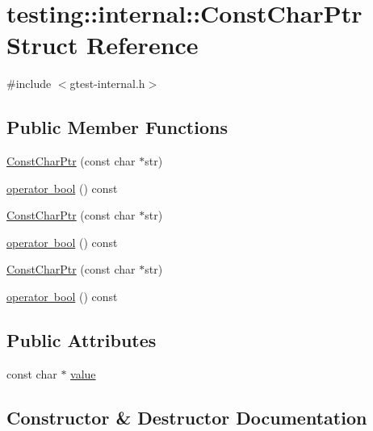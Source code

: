 \hypertarget{structtesting_1_1internal_1_1_const_char_ptr}{}\section{testing\+::internal\+::Const\+Char\+Ptr Struct Reference}
\label{structtesting_1_1internal_1_1_const_char_ptr}


{\ttfamily \#include $<$gtest-\/internal.\+h$>$}

\subsection*{Public Member Functions}
\begin{DoxyCompactItemize}
\item 
\mbox{\hyperlink{structtesting_1_1internal_1_1_const_char_ptr_ae94f6453fa679d815994eccc63062907}{Const\+Char\+Ptr}} (const char $\ast$str)
\item 
\mbox{\hyperlink{structtesting_1_1internal_1_1_const_char_ptr_a85c8174b5d4db8fe96863509ba767b27}{operator bool}} () const
\item 
\mbox{\hyperlink{structtesting_1_1internal_1_1_const_char_ptr_ae94f6453fa679d815994eccc63062907}{Const\+Char\+Ptr}} (const char $\ast$str)
\item 
\mbox{\hyperlink{structtesting_1_1internal_1_1_const_char_ptr_a85c8174b5d4db8fe96863509ba767b27}{operator bool}} () const
\item 
\mbox{\hyperlink{structtesting_1_1internal_1_1_const_char_ptr_ae94f6453fa679d815994eccc63062907}{Const\+Char\+Ptr}} (const char $\ast$str)
\item 
\mbox{\hyperlink{structtesting_1_1internal_1_1_const_char_ptr_a85c8174b5d4db8fe96863509ba767b27}{operator bool}} () const
\end{DoxyCompactItemize}
\subsection*{Public Attributes}
\begin{DoxyCompactItemize}
\item 
const char $\ast$ \mbox{\hyperlink{structtesting_1_1internal_1_1_const_char_ptr_a39e195c4214c28f7b1a7dd711742c56e}{value}}
\end{DoxyCompactItemize}


\subsection{Constructor \& Destructor Documentation}
\mbox{\label{structtesting_1_1internal_1_1_const_char_ptr_ae94f6453fa679d815994eccc63062907}} 
